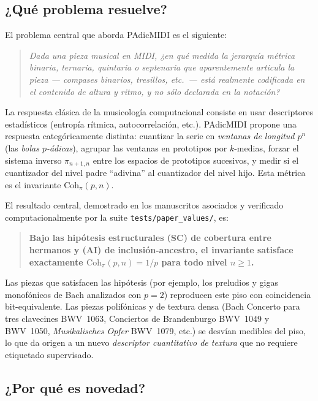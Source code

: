 \documentclass[11pt,a4paper,oneside]{article}
\theoremstyle{plain}
\theoremstyle{definition}
\theoremstyle{remark}
\newcommand{\Cohpi}{\mathrm{Coh}_\pi}
\begin{document}
\subsection{¿Qué problema resuelve?}

El problema central que aborda PAdicMIDI es el siguiente:

\begin{quote}\itshape
Dada una pieza musical en MIDI, ¿en qué medida la jerarquía métrica
binaria, ternaria, quintaria o septenaria que aparentemente articula la
pieza --- compases binarios, tresillos, etc.\ --- está \emph{realmente
codificada} en el contenido de altura y ritmo, y no sólo declarada en la
notación?
\end{quote}

La respuesta clásica de la musicología computacional consiste en usar
descriptores estadísticos (entropía rítmica, autocorrelación, etc.).
PAdicMIDI propone una respuesta categóricamente distinta: cuantizar la
serie en \emph{ventanas de longitud $p^n$} (las \emph{bolas
$p$-ádicas}), agrupar las ventanas en prototipos por
$k$-medias, forzar el sistema inverso $\pi_{n+1,n}$ entre los espacios
de prototipos sucesivos, y medir si el cuantizador del nivel padre
``adivina'' al cuantizador del nivel hijo. Esta métrica es el invariante
$\Cohpi(p,n)$.

El resultado central, demostrado en los manuscritos asociados y
verificado computacionalmente por la suite \texttt{tests/paper\_values/},
es:

\begin{quote}\bfseries
Bajo las hipótesis estructurales (SC) de cobertura entre hermanos y
(AI) de inclusión-ancestro, el invariante satisface exactamente
$\Cohpi(p,n) = 1/p$ para todo nivel $n \geq 1$.
\end{quote}

Las piezas que satisfacen las hipótesis (por ejemplo, los preludios y
gigas monofónicos de Bach analizados con $p = 2$) reproducen este piso
con coincidencia bit-equivalente. Las piezas polifónicas y de textura
densa (Bach Concerto para tres clavecines BWV~1063, Conciertos de
Brandenburgo BWV~1049 y BWV~1050, \emph{Musikalisches Opfer} BWV~1079,
etc.) se desvían medibles del piso, lo que da origen a un nuevo
\emph{descriptor cuantitativo de textura} que no requiere etiquetado
supervisado.

\subsection{¿Por qué es novedad?}
\end{document}
